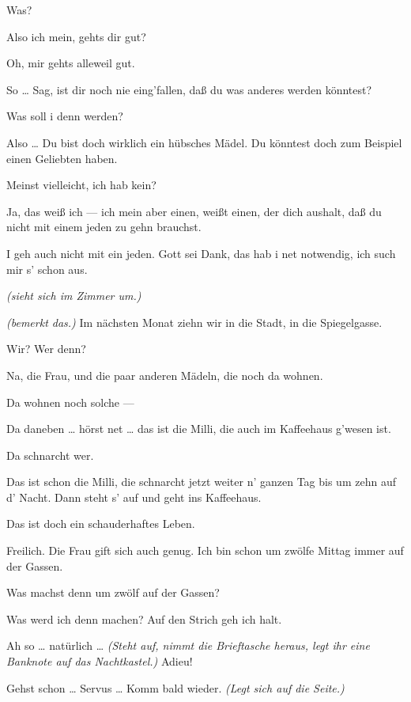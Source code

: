 \documentclass[
	final,
	a4paper,
	ngerman,
	mpinclude = true, %
	twoside = true,
	open = right,
	cleardoublepage = plain,
	DIV = 13,
	BCOR = 1cm,
	titlepage = firstiscover,
	]{scrbook}
\newcommand{\direction}[1]{\textit{(#1)}}
\newcommand{\thecharacter}[1]{\textup{\textsc{#1}}\xspace}
\newcommand{\thedirne}{\thecharacter{Nutte}}
\newcommand{\thegraf}{\thecharacter{Entrepeneurin}}
\newcommand{\character}[1]{\item[#1:]}
\newcommand{\dirne}{\character{\thedirne}}
\newcommand{\entrepeneurin}{\character{\thegraf}}
\begin{document}
\begin{play}
	\dirne
	Was?

	\entrepeneurin
	Also ich mein, gehts dir gut?

	\dirne
	Oh, mir gehts alleweil gut.

	\entrepeneurin
	So \ldots{} Sag, ist dir noch nie eing'fallen, daß du was anderes werden könntest?

	\dirne
	Was soll i denn werden?

	\entrepeneurin
	Also \ldots{} Du bist doch wirklich ein hübsches Mädel. Du könntest doch zum Beispiel einen Geliebten haben.

	\dirne
	Meinst vielleicht, ich hab kein?

	\entrepeneurin
	Ja, das weiß ich --- ich mein aber einen, weißt einen, der dich aushalt, daß du nicht mit einem jeden zu gehn brauchst.

	\dirne
	I geh auch nicht mit ein jeden. Gott sei Dank, das hab i net notwendig, ich such mir s' schon aus.

	\entrepeneurin
	\direction{sieht sich im Zimmer um.}

	\dirne
	\direction{bemerkt das.} Im nächsten Monat ziehn wir in die Stadt, in die Spiegelgasse.

	\entrepeneurin
	Wir? Wer denn?

	\dirne
	Na, die Frau, und die paar anderen Mädeln, die noch da wohnen.

	\entrepeneurin
	Da wohnen noch solche ---

	\dirne
	Da daneben \ldots{} hörst net \ldots{} das ist die Milli, die auch im Kaffeehaus g'wesen ist.

	\entrepeneurin
	Da schnarcht wer.

	\dirne
	Das ist schon die Milli, die schnarcht jetzt weiter n' ganzen Tag bis um zehn auf d' Nacht. Dann steht s' auf und geht ins Kaffeehaus.

	\entrepeneurin
	Das ist doch ein schauderhaftes Leben.

	\dirne
	Freilich. Die Frau gift sich auch genug. Ich bin schon um zwölfe Mittag immer auf der Gassen.

	\entrepeneurin
	Was machst denn um zwölf auf der Gassen?

	\dirne
	Was werd ich denn machen? Auf den Strich geh ich halt.

	\entrepeneurin
	Ah so \ldots{} natürlich \ldots{} \direction{Steht auf, nimmt die Brieftasche heraus, legt ihr eine Banknote auf das Nachtkastel.} Adieu!

	\dirne
	Gehst schon \ldots{} Servus \ldots{} Komm bald wieder. \direction{Legt sich auf die Seite.}


\end{play}
\end{document}
